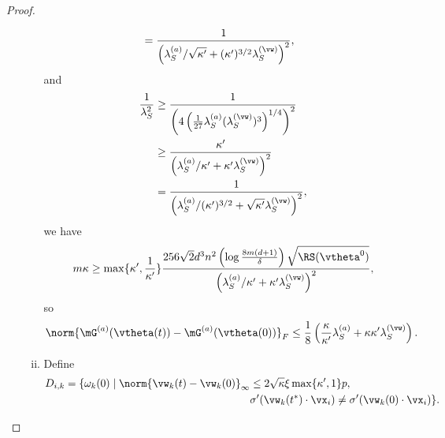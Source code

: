 \documentclass{article}
\begin{document}
\begin{proof}
\begin{enumerate}[(a)]
\begin{enumerate}[(i)]
\begin{equation}
\begin{aligned}
                                 & =\frac{1}{\left(\lambda_S^{(a)}/\sqrt{\kappa'}+(\kappa')^{3/2}\lambda_S^{(\vw)}\right)^2},
                            \end{aligned}
                        \end{equation}
                        and
                        \begin{equation}
                            \begin{aligned}
                                \frac{1}{\lambda_S^2}
                                 & \geq\frac{1}{\left(4\left(\frac{1}{27}\lambda_S^{(a)}(\lambda_S^{(\vw)})^3\right)^{1/4}\right) ^2} \\
                                 & \geq\frac{\kappa'}{\left(\lambda_S^{(a)}/\kappa'+\kappa'\lambda_S^{(\vw)}\right)^2}                \\
                                 & =\frac{1}{\left(\lambda_S^{(a)}/(\kappa')^{3/2}+\sqrt{\kappa'}\lambda_S^{(\vw)}\right)^2},
                            \end{aligned}
                        \end{equation}
                        we have
                        \begin{equation}
                            m\kappa\geq \max\{\kappa',\frac{1}{\kappa'}\}\frac{256\sqrt{2}d^3n^2\left(\log\frac{8m(d+1)}{\delta}\right)\sqrt{\RS(\vtheta^0)}}{\left(\lambda_S^{(a)}/\kappa'+\kappa'\lambda_S^{(\vw)}\right)^2},
                        \end{equation}
                        so
                        \begin{equation}\label{thm-proof:step1}
                            \norm{\mG^{(a)}(\vtheta(t)) - \mG^{(a)}(\vtheta(0))}_F\leq\frac{1}{8}\left(\frac{\kappa}{\kappa'}\lambda_S^{(a)}+\kappa\kappa'\lambda_S^{(\vw)}\right).
                        \end{equation}
                  \item Define
                        \begin{equation}
                            \begin{aligned}
                                D_{i,k}=\{\omega_k(0)\mid \norm{\vw_k(t)-\vw_k(0)}_{\infty} & \leq 2\sqrt{\kappa}\xi\max\{\kappa',1\} p,                       \\
                                                                                            & \sigma'(\vw_k(t^*)\cdot\vx_i)\not=\sigma'(\vw_k(0)\cdot\vx_i)\}.
                            \end{aligned}

\end{equation}
\end{enumerate}
\end{enumerate}
\end{proof}
\end{document}
